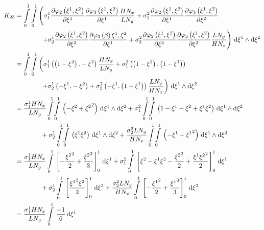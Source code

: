 \begin{equation}
  \begin{aligned}
    K_{23}&=\dintl{0}{1}\dintl{0}{1}\left(
    \conductivitytensorsymbol^{1}_{1}\delby{\lbfn{2}{\xione,\xitwo}}{\xione}
    \delby{\lbfn{3}{\xione,\xitwo}}{\xione}\dfrac{H N_{x}}{L N_{y}}+
    \conductivitytensorsymbol^{2}_{1}\delby{\lbfn{2}{\xione,\xitwo}}{\xione}
    \delby{\lbfn{3}{\xione,\xitwo}}{\xitwo}\right.\\
    &\qquad\qquad\left.+\conductivitytensorsymbol^{1}_{2}\delby{\lbfn{2}{\xione,\xitwo}}{\xitwo}
    \delby{\lbfn{3}{\beta}{\xione,\xitwo}}{\xione}+
    \conductivitytensorsymbol^{2}_{2}\delby{\lbfn{2}{\xione,\xitwo}}{\xitwo}
    \delby{\lbfn{3}{\xione,\xitwo}}{\xitwo}\dfrac{L N_{y}}{H N_{x}}\right)\infinitesimaltwo{\xione}{\xitwo}\\
    &=\dintl{0}{1}\dintl{0}{1}\left(
    \conductivitytensorsymbol^{1}_{1}\pbrac{\pbrac{1-\xitwo}.-\xitwo}\dfrac{H N_{x}}{L N_{y}}+
    \conductivitytensorsymbol^{2}_{1}\pbrac{\pbrac{1-\xitwo}.\pbrac{1-\xione}}\right.\\
    &\qquad\qquad\left.+\conductivitytensorsymbol^{1}_{2}\pbrac{-\xione.-\xitwo}+
    \conductivitytensorsymbol^{2}_{2}\pbrac{-\xione.\pbrac{1-\xione}}\dfrac{L N_{y}}{H N_{x}}\right)
    \infinitesimaltwo{\xione}{\xitwo}\\
    &=\dfrac{\conductivitytensorsymbol^{1}_{1} H N_{x}}{L N_{y}}\giint{0}{1}{0}{1}{\pbrac{-\xitwo+\xitwosq}}{\xione}{\xitwo}
    +\conductivitytensorsymbol^{2}_{1}\giint{0}{1}{0}{1}{\pbrac{1-\xione-\xitwo+\xione\xitwo}}{\xione}{\xitwo}\\
    &\qquad\qquad+\conductivitytensorsymbol^{1}_{2}\giint{0}{1}{0}{1}{\pbrac{\xione\xitwo}}{\xione}{\xitwo}
    +\dfrac{\conductivitytensorsymbol^{2}_{2} L N_{y}}{H N_{x}}\giint{0}{1}{0}{1}{\pbrac{-\xione+\xionesq}}{\xione}{\xitwo} \\
    &=\dfrac{\conductivitytensorsymbol^{1}_{1} H N_{x}}{L N_{y}}\gint{0}{1}{\sqbrac{-\dfrac{\xitwosq}{2}+\dfrac{\xitwocube}{3}}^{1}_{0}}{\xione}
    +\conductivitytensorsymbol^{2}_{1}\gint{0}{1}{\sqbrac{\xitwo-\xione\xitwo-\dfrac{\xitwosq}{2}+\dfrac{\xione\xitwosq}{2}}^{1}_{0}}{\xione}\\
    &\qquad\qquad+\conductivitytensorsymbol^{1}_{2}\gint{0}{1}{\sqbrac{\dfrac{\xionesq\xitwo}{2}}^{1}_{0}}{\xitwo}
    +\dfrac{\conductivitytensorsymbol^{2}_{2} L N_{y}}{H N_{x}}\gint{0}{1}{\sqbrac{-\dfrac{\xionesq}{2}+\dfrac{\xionecube}{3}}^{1}_{0}}{\xitwo} \\
    &=\dfrac{\conductivitytensorsymbol^{1}_{1} H N_{x}}{L N_{y}}\gint{0}{1}{\dfrac{-1}{6}}{\xione}

\end{aligned}
\end{equation}
